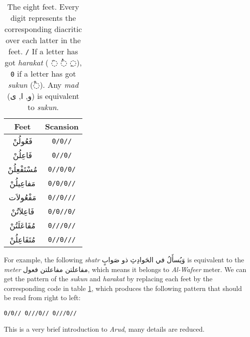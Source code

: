 \begin{table}[!t]
	\centering
	\begin{tabular}{|c|c|}
		\hline
		\textbf{Feet} & \textbf{Scansion} \\
		\hline
		\textarabic{فَعُولُنْ}  & \texttt{0/0//}\\
		\textarabic{فَاعِلُنْ}  & \texttt{0//0/}\\
		\textarabic{مُسْتَفْعِلُنْ}& \texttt{0//0/0/}\\
		\textarabic{مَفاعِيلُنْ}& \texttt{0/0/0//}\\
		\textarabic{مَفْعُولاَت} & \texttt{0//0///}\\
		\textarabic{فَاعِلاَتُنْ} & \texttt{0/0//0/}\\
		\textarabic{مُفَاعَلَتُنْ}& \texttt{0///0//}\\
		\textarabic{مُتَفَاعِلُنْ}& \texttt{0//0///}\\
		\hline
	\end{tabular}
	\caption{The eight feet. Every digit represents the corresponding diacritic
		over each latter in the feet. \texttt{/} If a letter has got \textit{harakat} (
		\textarabic{◌َ} \textarabic{◌ُ} \textarabic{◌ِ}), \texttt{0} if a letter has got
		\textit{sukun} (\textarabic{◌ْ}). Any \textit{mad} (\textarabic{و, ا, ى}) is
		equivalent to \textit{sukun}.}\label{arud:feet}
\end{table}


For example, the following \textit{shatr} \textarabic{وَيُسأَلُ في الحَوادِثِ ذو صَوابٍ} is
equivalent to the \textit{meter} \textarabic{مفاعلتن مفاعلتن فعول}, which means
it belongs to \textit{Al-Wafeer} meter. We can get the pattern of the
\textit{sukun} and \textit{harakat} by replacing each feet by the corresponding
code in table \ref{arud:feet}, which produces the following pattern that should
be read from right to left:%
\begin{flushright}
	{\texttt{0/0// 0///0// 0///0//}} %
\end{flushright}
This is a very brief introduction to \textit{Arud}, many details are reduced.




